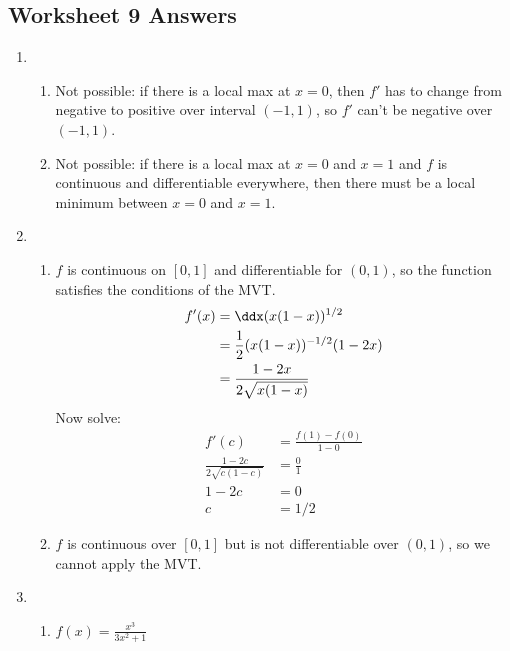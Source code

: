 \newpage\subsection*{\Course Worksheet 9 Answers}
\begin{enumerate}
    
    \item 
    \begin{enumerate}
        \item Not possible: if there is a local max at $x=0$, then $f'$ has to change from negative to positive over interval $(-1,1)$, so $f'$ can't be negative over $(-1,1)$. 
        \item Not possible: if there is a local max at $x=0$ and $x=1$ and $f$ is continuous and differentiable everywhere, then there must be a local minimum between $x=0$ and $x=1$. 
    \end{enumerate}
    
    
    
    
    
    \item 
    \begin{enumerate}
        \item $f$ is continuous on $[0,1]$ and differentiable for $(0,1)$, so the function satisfies the conditions of the MVT. 
        \begin{align*}
        	f'(x) 
            &= \ddx (x(1-x))^{1/2}\\
            &= \frac 1 2 (x(1-x))^{-1/2}(1 - 2x) \\
            &= \frac{1 - 2x}{2\sqrt{x(1-x)}}
        \end{align*}
        Now solve:
        \begin{align*}
        	f'(c) &= \frac{f(1)-f(0)}{1-0} \\
            \frac{1 - 2c}{2\sqrt{c(1-c)}} &= \frac 0 1 \\
            1- 2c &= 0\\
            c &= 1/2
        \end{align*}
        
        
        \item $f$ is continuous over $[0,1]$ but is not differentiable over $(0,1)$, so we cannot apply the MVT. 
    \end{enumerate}

	\item
	\begin{enumerate}
	\item $\displaystyle f(x)=\frac{x^3}{3x^2+1}$


\end{enumerate}
\end{enumerate}
